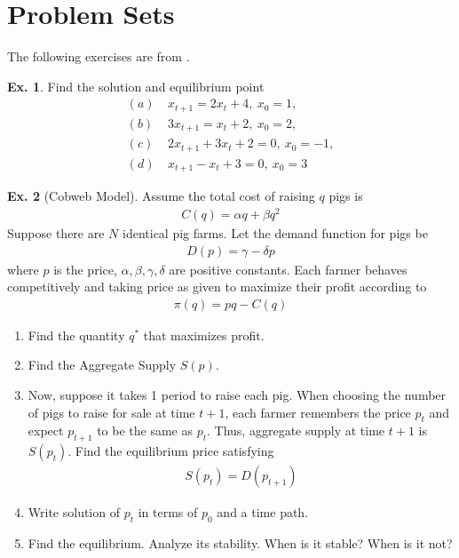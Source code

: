 \documentclass[11pt,a4paper]{book}
\theoremstyle{definition}\newtheorem{definition}{Definition}
\theoremstyle{definition}\newtheorem{fact}{Fact}
\theoremstyle{definition}\newtheorem{remark}{Remark}
\theoremstyle{definition}\newtheorem{ex}{Ex.}
\theoremstyle{definition}\newtheorem{project}{Project}
\theoremstyle{definition}\newtheorem{problem}{Problem}
\theoremstyle{definition}\newtheorem{example}{Example}
\numberwithin{theorem}{section}
\numberwithin{corollary}{chapter}
\numberwithin{assumption}{chapter}
\numberwithin{definition}{chapter}
\numberwithin{prop}{chapter}
\numberwithin{notation}{chapter}
\numberwithin{problem}{chapter}
\numberwithin{example}{chapter}
\numberwithin{fact}{chapter}
\numberwithin{ex}{chapter}
\begin{document}
	\section{Problem Sets}
	The following exercises are from \citet[p.395--399]{sydsaeter2008further}.
	\begin{ex}
		Find the solution and equilibrium point
		\begin{align*}
			(a)\ & x_{t+1} = 2 x_t + 4, \ x_0 = 1, \\
			(b)\ & 3 x_{t+1} = x_t +2, \ x_0 = 2, \\
			(c)\ & 2 x_{t+1} + 3 x_t + 2 = 0, \ x_0 = -1, \\
			(d)\ & x_{t+1} - x_t + 3 = 0, \ x_0 = 3
		\end{align*}
	\end{ex}
	
	\begin{ex}[Cobweb Model]
		Assume the total cost of raising $q$ pigs is
		\begin{align*}
			C(q) = \alpha q + \beta q^2
		\end{align*}
		Suppose there are $N$ identical pig farms. Let the demand function for pigs be
		\begin{align*}
			D(p) = \gamma - \delta p
		\end{align*}
		where $p$ is the price, $\alpha,\beta,\gamma,\delta$ are positive constants. Each farmer behaves competitively and taking price as given to maximize their profit according to
		\begin{align*}
			\pi(q) = pq - C(q)
		\end{align*}
		\begin{enumerate}
			\item Find the quantity $q^*$ that maximizes profit.
			\item Find the Aggregate Supply $S(p)$.
			\item Now, suppose it takes 1 period to raise each pig. When choosing the number of pigs to raise for sale at time $t+1$, each farmer remembers the price $p_t$ and expect $p_{t+1}$ to be the same as $p_t$. Thus, aggregate supply at time $t+1$ is $S(p_t)$. Find the equilibrium price satisfying
			\begin{align*}
				S(p_t) = D(p_{t+1})
			\end{align*}
			\item Write solution of $p_t$ in terms of $p_0$ and a time path.
			\item Find the equilibrium. Analyze its stability. When is it stable? When is it not?
		\end{enumerate}
	\end{ex}	
		
\end{document}
